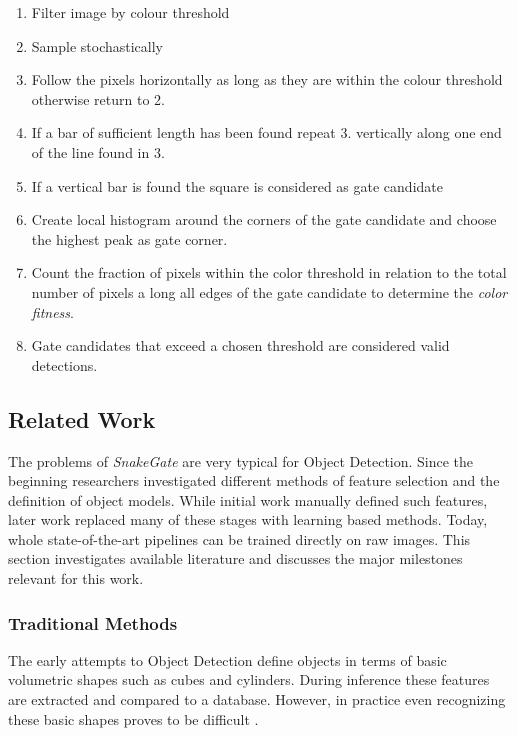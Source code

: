 \begin{enumerate}
	\item Filter image by colour threshold
	\item Sample stochastically 
	\item Follow the pixels horizontally as long as they are within the colour threshold otherwise return to 2.
	\item If a bar of sufficient length has been found repeat 3. vertically along one end of the line found in 3.
	\item If a vertical bar is found the square is considered as gate candidate
	\item Create local histogram around the corners of the gate candidate and choose the highest peak as gate corner.
	\item Count the fraction of pixels within the color threshold  in relation to the total number of pixels a long all edges of the gate candidate to determine the \textit{color fitness}.
	\item Gate candidates that exceed a chosen threshold are considered valid detections.
\end{enumerate}


\subsection{Related Work}

The problems of \textit{SnakeGate} are very typical for Object Detection. Since the beginning researchers investigated different methods of feature selection and the definition of object models. While initial work manually defined such features, later work replaced many of these stages with learning based methods. Today, whole state-of-the-art pipelines can be trained directly on raw images. This section investigates available literature and discusses the major milestones relevant for this work.

\subsubsection{Traditional Methods}

The early attempts to Object Detection define objects in terms of basic volumetric shapes such as cubes and cylinders. During inference these features are extracted and compared to a database. However, in practice even recognizing these basic shapes proves to be difficult \cite{Andreopoulos2013}. 

